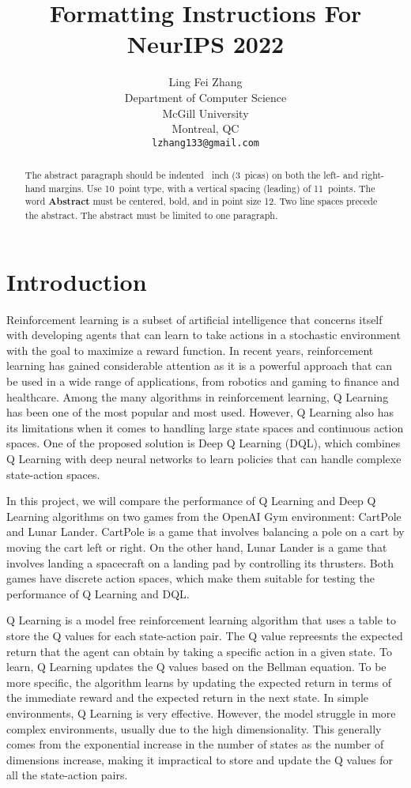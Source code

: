 \documentclass{article}
\title{Formatting Instructions For NeurIPS 2022}
\author{%
      Ling Fei Zhang\\
      Department of Computer Science\\ McGill University\\ Montreal, QC \\
      \texttt{lzhang133@gmail.com} \\
}
\begin{document}
\maketitle

\begin{abstract}
      The abstract paragraph should be indented ~inch (3~picas) on
      both the left- and right-hand margins. Use 10~point type, with a vertical
      spacing (leading) of 11~points.  The word \textbf{Abstract} must be centered,
      bold, and in point size 12. Two line spaces precede the abstract. The abstract
      must be limited to one paragraph.
\end{abstract}

\section{Introduction}

Reinforcement learning is a subset of artificial intelligence that concerns
itself with developing agents that can learn to take actions in a stochastic
environment with the goal to maximize a reward function. In recent years,
reinforcement learning has gained considerable attention as it is a powerful
approach that can be used in a wide range of applications, from robotics and
gaming to finance and healthcare. Among the many algorithms in reinforcement
learning, Q Learning has been one of the most popular and most used. However, Q
Learning also has its limitations when it comes to handling large state spaces
and continuous action spaces. One of the proposed solution is Deep Q Learning
(DQL), which combines Q Learning with deep neural networks to learn policies
that can handle complexe state-action spaces.

In this project, we will compare the performance of Q Learning and Deep Q
Learning algorithms on two games from the OpenAI Gym environment: CartPole and
Lunar Lander. CartPole is a game that involves balancing a pole on a cart by
moving the cart left or right. On the other hand, Lunar Lander is a game that
involves landing a spacecraft on a landing pad by controlling its thrusters.
Both games have discrete action spaces, which make them suitable for testing
the performance of Q Learning and DQL.

Q Learning is a model free reinforcement learning algorithm that uses a table
to store the Q values for each state-action pair. The Q value repreesnts the
expected return that the agent can obtain by taking a specific action in a
given state. To learn, Q Learning updates the Q values based on the Bellman
equation. To be more specific, the algorithm learns by updating the expected
return in terms of the immediate reward and the expected return in the next
state. In simple environments, Q Learning is very effective. However, the model
struggle in more complex environments, usually due to the high dimensionality.
This generally comes from the exponential increase in the number of states as
the number of dimensions increase, making it impractical to store and update
the Q values for all the state-action pairs.
\end{document}
